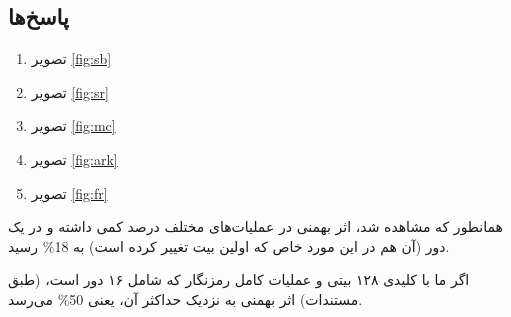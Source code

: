 \documentclass{article}
\begin{document}
\subsection{پاسخ‌ها}
\begin{enumerate}[label=\alph*)]
\item {}
تصویر
\ref{fig:sb}

\item {}
تصویر
\ref{fig:sr}

\item {}
تصویر
\ref{fig:mc}

\item {}
تصویر
\ref{fig:ark}

\item {}
تصویر
\ref{fig:fr}
\end{enumerate}

همانطور که مشاهده شد، اثر بهمنی در عملیات‌های مختلف درصد کمی داشته و در یک دور (آن هم در این مورد خاص که اولین بیت تغییر کرده است) به 18\% رسید.

اگر ما با کلیدی ۱۲۸ بیتی و عملیات کامل رمزنگار
که شامل ۱۶ دور است، (طبق مستندات) اثر بهمنی به نزدیک حداکثر آن، یعنی 50\% می‌رسد.


\begin{figure}[b]
\begin{center}
\end{center}
\end{figure}
\end{document}
